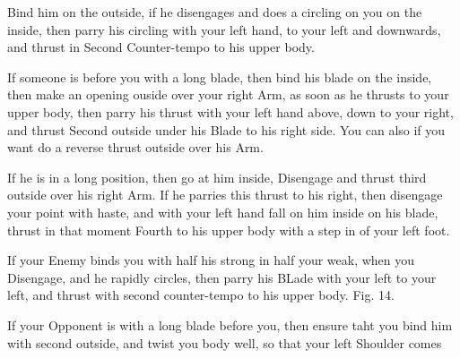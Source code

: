 \newpage


\newpage


\exercise{}
Bind him on the outside, if he disengages and does a circling on you
on the inside, then parry his circling with your left hand, to your
left and downwards, and thrust in Second Counter-tempo to his upper
body.

\exercise{}
If someone is before you with a long blade, then bind his blade on the
inside, then make an opening ouside over your right Arm, as soon as he
thrusts to your upper body, then parry his thrust with your left hand
above, down to your right, and thrust Second outside under his Blade
to his right side. You can also if you want do a reverse thrust
outside over his Arm.

\exercise{}
If he is in a long position, then go at him inside, Disengage and
thrust third outside over his right Arm. If he parries this thrust to
his right, then disengage your point with haste, and with your left
hand fall on him inside on his blade, thrust in that moment Fourth to
his upper body with a step in of your left foot.

\exercise{}
If your Enemy binds you with half his strong in half your weak, when
you Disengage, and he rapidly circles, then parry his BLade with your
left to your left, and thrust with second counter-tempo to his upper
body. Fig. 14.

\exercise{}
If your Opponent is with a long blade before you, then ensure taht you
bind him with second outside, and twist you body well, so that your
left Shoulder comes
